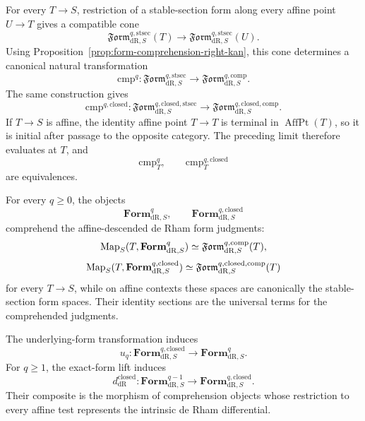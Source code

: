 \begin{construction}
\label{con:intrinsic-comprehended-form-comparison}
For every \(T\to S\), restriction of a stable-section form along every affine point
\(U\to T\) gives a compatible cone
\[
  \mathfrak{Form}^{q,\mathrm{stsec}}_{\mathrm{dR},S}(T)
  \longrightarrow
  \mathfrak{Form}^{q,\mathrm{stsec}}_{\mathrm{dR},S}(U).
\]
Using Proposition~\ref{prop:form-comprehension-right-kan}, this cone determines a
canonical natural transformation
\[
  \mathrm{cmp}^q:
  \mathfrak{Form}^{q,\mathrm{stsec}}_{\mathrm{dR},S}
  \longrightarrow
  \mathfrak{Form}^{q,\mathrm{comp}}_{\mathrm{dR},S}.
\]
The same construction gives
\[
  \mathrm{cmp}^{q,\mathrm{closed}}:
  \mathfrak{Form}^{q,\mathrm{closed},\mathrm{stsec}}_{\mathrm{dR},S}
  \longrightarrow
  \mathfrak{Form}^{q,\mathrm{closed},\mathrm{comp}}_{\mathrm{dR},S}.
\]
If \(T\to S\) is affine, the identity affine point \(T\to T\) is terminal in
\(\operatorname{AffPt}(T)\), so it is initial after passage to the opposite
category. The preceding limit therefore evaluates at \(T\), and
\[
  \mathrm{cmp}_T^q,
  \qquad
  \mathrm{cmp}_T^{q,\mathrm{closed}}
\]
are equivalences.
\end{construction}

\begin{theorem}
\label{thm:internal-moduli-forms-detailed}
For every \(q\geq0\), the objects
\[
  \mathbf{Form}^q_{\mathrm{dR},S},
  \qquad
  \mathbf{Form}^{q,\mathrm{closed}}_{\mathrm{dR},S}
\]
comprehend the affine-descended de Rham form judgments:
\[
  \operatorname{Map}_S(T,\mathbf{Form}^q_{\mathrm{dR},S})
  \simeq
  \mathfrak{Form}^{q,\mathrm{comp}}_{\mathrm{dR},S}(T),
\]
\[
  \operatorname{Map}_S(T,\mathbf{Form}^{q,\mathrm{closed}}_{\mathrm{dR},S})
  \simeq
  \mathfrak{Form}^{q,\mathrm{closed},\mathrm{comp}}_{\mathrm{dR},S}(T)
\]
for every \(T\to S\), while on affine contexts these spaces are canonically the
stable-section form spaces. Their identity sections are the universal
terms for the comprehended judgments.

The underlying-form transformation induces
\[
  u_q:
  \mathbf{Form}^{q,\mathrm{closed}}_{\mathrm{dR},S}
  \longrightarrow
  \mathbf{Form}^q_{\mathrm{dR},S}.
\]
For \(q\geq1\), the exact-form lift induces
\[
  d^{\mathrm{closed}}_{\mathrm{dR}}:
  \mathbf{Form}^{q-1}_{\mathrm{dR},S}
  \longrightarrow
  \mathbf{Form}^{q,\mathrm{closed}}_{\mathrm{dR},S}.
\]
Their composite is the morphism of comprehension objects whose restriction to every
affine test represents the intrinsic de Rham differential.
\end{theorem}

